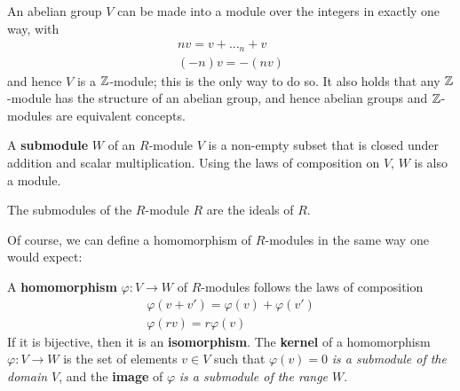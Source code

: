 \documentclass{memoir}
\begin{document}
An abelian group \(V\) can be made into a module over the integers in exactly one way, with
\begin{align*}
	nv = v + \ldots_{n} + v\\
	(-n)v = -(nv)
\end{align*}
and hence \(V\) is a \(\mathbb{Z}\)-module; this is the only way to do so. It also holds that any \(\mathbb{Z}\)-module has the structure of an abelian group, and hence abelian groups and \(\mathbb{Z}\)-modules are equivalent concepts.

\begin{defn}[Submodule]
	A \textbf{submodule} \(W\) of an \(R\)-module \(V\) is a non-empty subset that is closed under addition and scalar multiplication. Using the laws of composition on \(V\), \(W\) is also a module.
\end{defn}

\begin{prop}
	The submodules of the \(R\)-module \(R\) are the ideals of \(R\).
\end{prop}
Of course, we can define a homomorphism of \(R\)-modules in the same way one would expect:
\begin{defn}
	A \textbf{homomorphism} \(\varphi:V\to W\) of \(R\)-modules follows the laws of composition
	\begin{align*}
		\varphi(v+v') = \varphi(v) + \varphi(v')\\
		\varphi(rv) = r\varphi(v)
	\end{align*}
	If it is bijective, then it is an \textbf{isomorphism}. The \textbf{kernel} of a homomorphism \(\varphi:V\to W\) is the set of elements \(v \in V\) such that \(\varphi(v)= 0\) \textit{is a submodule of the domain \(V\)}, and the \textbf{image} of \(\varphi\) \textit{is a submodule of the range \(W\)}.
\end{defn}
\end{document}
